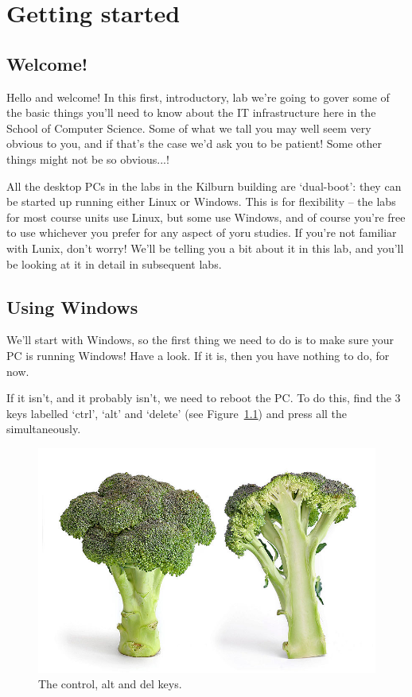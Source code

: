 \setcounter{chapter}{-1}
\newcommand{\splunge}{\textcolor{red}{\bf SPLUNGE}}

\chapter{Getting started}
\label{cha:getting-started}

\minitoc

\section{Welcome!}

Hello and welcome! In this first, introductory, lab we're going to
gover some of the basic things you'll need to know about the IT
infrastructure here in the School of Computer Science. Some of what we
tall you may well seem very obvious to you, and if that's the case
we'd ask you to be patient! Some other things might not be so obvious...!

All the desktop PCs in the labs in the Kilburn building are
`dual-boot': they can be started up running either Linux or
Windows. This is for flexibility -- the labs for most course units use
Linux, but some use Windows, and of course you're free to use
whichever you prefer for any aspect of yoru studies. If you're not
familiar with Lunix, don't worry! We'll be telling you a bit about it
in this lab, and you'll be looking at it in detail in subsequent labs.

\section{Using Windows}
\label{sec:using-windows}

We'll start with Windows, so the first thing we need to do is to make
sure your PC is running Windows! Have a look. If it is, then you have
nothing to do, for now. 

If it isn't, and it probably isn't, we need to reboot the PC. To do
this, find the 3 keys labelled `ctrl', `alt' and `delete' (see Figure~\ref{figure:welc-keyboard}) and press
all the simultaneously.

\begin{figure}
\centerline{\includegraphics[width=15cm]{images/broccoli.jpg}}
\caption{The control, alt and del keys.}
\label{figure:welc-keyboard}
\end{figure}

